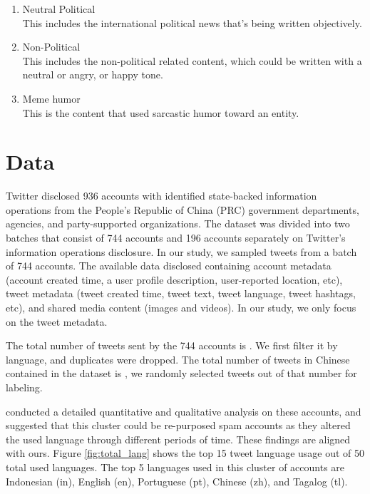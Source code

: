 \documentclass[sigconf]{acmart}
\begin{document}
\begin{enumerate}
  \item Neutral Political \\
  This includes the international political news that's being written objectively. 
  
  \item Non-Political\\
    This includes the non-political related content, which could be written with a neutral or angry, or happy tone. 

  \item Meme humor\\
  This is the content that used sarcastic humor toward an entity.
\end{enumerate}

\section{Data}

Twitter disclosed 936 accounts with identified state-backed information operations from the People’s Republic of China (PRC) government departments, agencies, and party-supported organizations. The dataset was divided into two batches that consist of 744 accounts and 196 accounts separately on Twitter's information operations disclosure. In our study, we sampled tweets from a batch of 744 accounts. The available data disclosed containing account metadata (account created time, a user profile description, user-reported location, etc), tweet metadata (tweet created time, tweet text, tweet language, tweet hashtags, etc), and shared media content (images and videos). In our study, we only focus on the tweet metadata.  

The total number of tweets sent by the 744 accounts is . We first filter it by language, and duplicates were dropped. The total number of tweets in Chinese contained in the dataset is , we randomly selected  tweets out of that number for labeling. 

\citet{uren2019tweeting} conducted a detailed quantitative and qualitative analysis on these accounts, and suggested that this cluster could be re-purposed spam accounts as they altered the used language through different periods of time. These findings are aligned with ours. Figure \ref{fig:total_lang} shows the top 15 tweet language usage out of 50 total used languages. The top 5 languages used in this cluster of accounts are  Indonesian (in), English (en), Portuguese (pt), Chinese (zh), and Tagalog (tl). 
\end{document}
